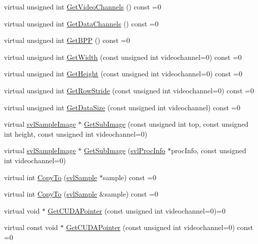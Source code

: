 \begin{DoxyCompactItemize}
\item 
virtual unsigned int \hyperlink{classsvl_sample_c_u_d_a_image_a37d6b27087d1c2f1c88c0a1f643f56e4}{Get\-Video\-Channels} () const =0
\item 
virtual unsigned int \hyperlink{classsvl_sample_c_u_d_a_image_a0c65f845f61252de75eb0ee7eec33c2a}{Get\-Data\-Channels} () const =0
\item 
virtual unsigned int \hyperlink{classsvl_sample_c_u_d_a_image_a70064e27b2da53aa23cc14a912df4947}{Get\-B\-P\-P} () const =0
\item 
virtual unsigned int \hyperlink{classsvl_sample_c_u_d_a_image_a3360fac3241f26806cc4bd792920338e}{Get\-Width} (const unsigned int videochannel=0) const =0
\item 
virtual unsigned int \hyperlink{classsvl_sample_c_u_d_a_image_ab6d91b6ab95b3a020018f2b619c68f15}{Get\-Height} (const unsigned int videochannel=0) const =0
\item 
virtual unsigned int \hyperlink{classsvl_sample_c_u_d_a_image_a86041b091b6227b6ed5ff7610b364733}{Get\-Row\-Stride} (const unsigned int videochannel=0) const =0
\item 
virtual unsigned int \hyperlink{classsvl_sample_c_u_d_a_image_a921357e8b357e1ce5b913c0d89150b5f}{Get\-Data\-Size} (const unsigned int videochannel) const =0
\item 
virtual \hyperlink{classsvl_sample_image}{svl\-Sample\-Image} $\ast$ \hyperlink{classsvl_sample_c_u_d_a_image_a0f07da2017998aef3bff17a0956dbc88}{Get\-Sub\-Image} (const unsigned int top, const unsigned int height, const unsigned int videochannel=0)
\item 
virtual \hyperlink{classsvl_sample_image}{svl\-Sample\-Image} $\ast$ \hyperlink{classsvl_sample_c_u_d_a_image_a45d29278924d1f0c66619d2b4ed4dc47}{Get\-Sub\-Image} (\hyperlink{structsvl_proc_info}{svl\-Proc\-Info} $\ast$proc\-Info, const unsigned int videochannel=0)
\item 
virtual int \hyperlink{classsvl_sample_c_u_d_a_image_a19dd2a29c0b61543699c2545d01adf89}{Copy\-To} (\hyperlink{classsvl_sample}{svl\-Sample} $\ast$sample) const =0
\item 
virtual int \hyperlink{classsvl_sample_c_u_d_a_image_ad2e4bb2a1d02a9c6c6ffab7c86dc881c}{Copy\-To} (\hyperlink{classsvl_sample}{svl\-Sample} \&sample) const =0
\item 
virtual void $\ast$ \hyperlink{classsvl_sample_c_u_d_a_image_a4a13798167e9c90354db8dcd9f2ee05a}{Get\-C\-U\-D\-A\-Pointer} (const unsigned int videochannel=0)=0
\item 
virtual const void $\ast$ \hyperlink{classsvl_sample_c_u_d_a_image_aacba1f3823ca1cfbfaf2210e786c6a0a}{Get\-C\-U\-D\-A\-Pointer} (const unsigned int videochannel=0) const =0
\end{DoxyCompactItemize}
